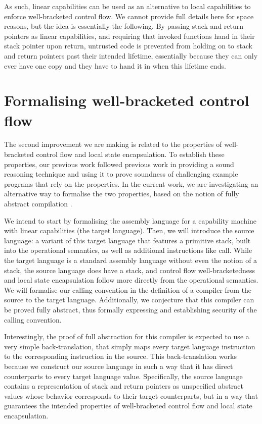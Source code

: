 \documentclass[sigplan, review]{acmart}
\begin{document}
As such, linear capabilities can be used as an alternative to local capabilities to enforce well-bracketed control flow.
We cannot provide full details here for space reasons, but the idea is essentially the following.
By passing stack and return pointers as linear capabilities, and requiring that invoked functions hand in their stack pointer upon return, untrusted code is prevented from holding on to stack and return pointers past their intended lifetime, essentially because they can only ever have one copy and they have to hand it in when this lifetime ends.

\section{Formalising well-bracketed control flow}
The second improvement we are making is related to the properties of well-bracketed control flow and local state encapsulation.
To establish these properties, our previous work followed previous work \citep{dreyer_impact_2010} in providing a sound reasoning technique and using it to prove soundness of challenging example programs that rely on the properties.
In the current work, we are investigating an alternative way to formalise the two properties, based on the notion of fully abstract compilation \citep{abadi_protection_1999}.

We intend to start by formalising the assembly language for a capability machine with linear capabilities (the target language).
Then, we will introduce the source language: a variant of this target language that features a primitive stack, built into the operational semantics, as well as additional instructions like call.
While the target language is a standard assembly language without even the notion of a stack, the source language does have a stack, and control flow well-bracketedness and local state encapsulation follow more directly from the operational semantics.
We will formalise our calling convention in the definition of a compiler from the source to the target language.
Additionally, we conjecture that this compiler can be proved fully abstract, thus formally expressing and establishing security of the calling convention.

Interestingly, the proof of full abstraction for this compiler is expected to use a very simple back-translation, that simply maps every target language instruction to the corresponding instruction in the source.
This back-translation works because we construct our source language in such a way that it has direct counterparts to every target language value.
Specifically, the source language contains a representation of stack and return pointers as unspecified abstract values whose behavior corresponds to their target counterparts, but in a way that guarantees the intended properties of well-bracketed control flow and local state encapsulation.


 
\end{document}
